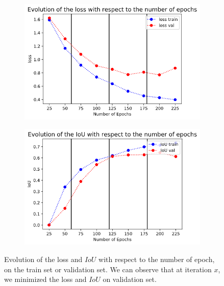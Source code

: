 \documentclass[9pt,conference,compsocconf]{IEEEtran}
\begin{document}
\begin{figure}[h!]
    \centering
     \begin{subfigure}[b]{0.23\textwidth}
         \centering
        \includegraphics[width=\textwidth]{figures/loss200_batch5loss4.png}
        \label{fig:full_loss}
     \end{subfigure}
     \hfill
     \begin{subfigure}[b]{0.23\textwidth}
         \centering
        \includegraphics[width=\textwidth]{figures/iou200_batch5loss4.png}
        \label{fig:full_loss}
     \end{subfigure}
 \caption{\footnotesize{Evolution of the loss and $IoU$ with respect to the number of epoch, on the train set or validation set. We can observe that at iteration $x$, we minimized the loss and $IoU$ on validation set.}}
 \label{fig:full_loss_iou}
\end{figure}
\end{document}

